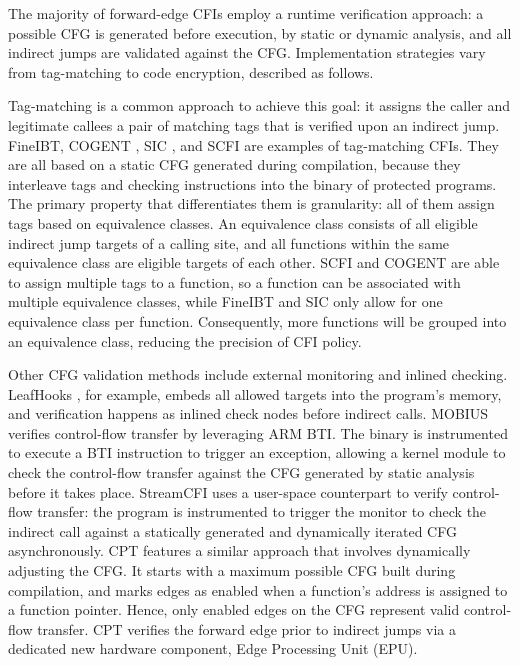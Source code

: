 \documentclass[journal,onecolumn]{IEEEtran}
\begin{document}
The majority of forward-edge CFIs employ a runtime verification approach: a possible CFG is generated before execution, by static or dynamic analysis, and all indirect jumps are validated against the CFG. Implementation strategies vary from tag-matching to code encryption, described as follows.

Tag-matching is a common approach to achieve this goal: it assigns the caller and legitimate callees a pair of matching tags that is verified upon an indirect jump. FineIBT\cite{Gaidis23}, COGENT \cite{Demicco25}, SIC \cite{Hashemi26}, and SCFI \cite{She24} are examples of tag-matching CFIs. They are all based on a static CFG generated during compilation, because they interleave tags and checking instructions into the binary of protected programs. The primary property that differentiates them is granularity: all of them assign tags based on equivalence classes. An equivalence class consists of all eligible indirect jump targets of a calling site, and all functions within the same equivalence class are eligible targets of each other. SCFI and COGENT are able to assign multiple tags to a function, so a function can be associated with multiple equivalence classes, while FineIBT and SIC only allow for one equivalence class per function. Consequently, more functions will be grouped into an equivalence class, reducing the precision of CFI policy\cite{Burow18}.

Other CFG validation methods include external monitoring and inlined checking. LeafHooks \cite{Zhao25b}, for example, embeds all allowed targets into the program's memory, and verification happens as inlined check nodes before indirect calls. MOBIUS \cite{Yue25} verifies control-flow transfer by leveraging ARM BTI. The binary is instrumented to execute a BTI instruction to trigger an exception, allowing a kernel module to check the control-flow transfer against the CFG generated by static analysis before it takes place. StreamCFI \cite{Kleftogiorgos26} uses a user-space counterpart to verify control-flow transfer: the program is instrumented to trigger the monitor to check the indirect call against a statically generated and dynamically iterated CFG asynchronously. CPT \cite{Kim23} features a similar approach that involves dynamically adjusting the CFG. It starts with a maximum possible CFG built during compilation, and marks edges as enabled when a function's address is assigned to a function pointer. Hence, only enabled edges on the CFG represent valid control-flow transfer. CPT verifies the forward edge prior to indirect jumps via a dedicated new hardware component, Edge Processing Unit (EPU).
\end{document}
